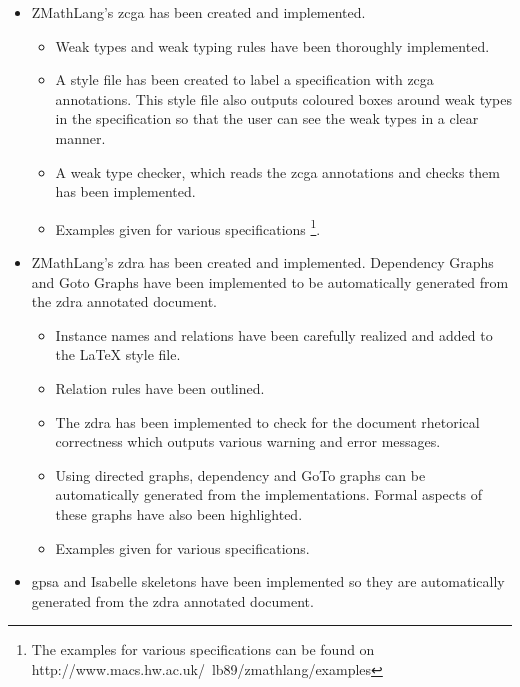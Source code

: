 \begin{itemize}
\item ZMathLang's \gls{zcga} has been created and implemented.

\begin{itemize}

\item Weak types and weak typing rules have been thoroughly implemented. 

\item A style file has been created to label a specification with \gls{zcga} annotations. This style file also outputs coloured boxes around weak types in the specification so that the user can see the weak types in a clear manner.

\item A weak type checker, which reads the \gls{zcga} annotations and checks them has been implemented.

\item Examples given for various specifications \footnote{The examples for various specifications can be found on http://www.macs.hw.ac.uk/~lb89/zmathlang/examples}.
\end{itemize}

\item ZMathLang's \gls{zdra} has been created and implemented. Dependency Graphs and Goto Graphs have been implemented to be automatically generated from the \gls{zdra} annotated document.

\begin{itemize}
\item Instance names and relations have been carefully realized and added to the \LaTeX{} style file.

\item Relation rules have been outlined.

\item The \gls{zdra} has been implemented to check for the document rhetorical correctness which outputs various warning and error messages.

\item Using directed graphs, dependency and GoTo graphs can be automatically generated from the implementations. Formal aspects of these graphs have also been highlighted.

\item Examples given for various specifications.
\end{itemize}

\item \gls{gpsa} and Isabelle skeletons have been implemented so they are automatically generated from the \gls{zdra} annotated document.


\end{itemize}
